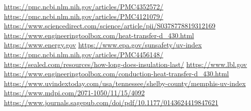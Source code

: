 \documentclass[12pt]{article}
\begin{document}
\newpage
\begin{thebibliography}{56}
\url{https://pmc.ncbi.nlm.nih.gov/articles/PMC4352572/}
\url{https://pmc.ncbi.nlm.nih.gov/articles/PMC4121079/}
\url{https://www.sciencedirect.com/science/article/pii/S0378778819312169}
\url{https://www.engineeringtoolbox.com/heat-transfer-d_430.html}
\url{https://www.energy.gov}
\url{https://www.epa.gov/sunsafety/uv-index}
\url{https://pmc.ncbi.nlm.nih.gov/articles/PMC4456148/}
\url{https://sealed.com/resources/how-long-does-insulation-last/}
\url{https://www.lbl.gov}
\url{https://www.engineeringtoolbox.com/conduction-heat-transfer-d_430.html}
\url{https://www.uvindextoday.com/usa/tennessee/shelby-county/memphis-uv-index}
\url{https://www.mdpi.com/2071-1050/11/15/4092}
\url{https://www.journals.sagepub.com/doi/pdf/10.1177/0143624419847621}




\end{thebibliography}
\end{document}
